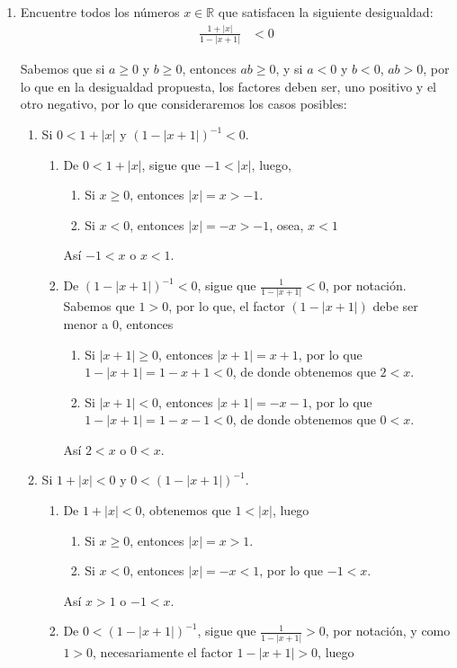 \documentclass[11pt]{article}
\newcommand{\R}{\mathbb{R}}
\begin{document}
\begin{enumerate}
\item Encuentre todos los números $x\in \R$ que satisfacen la siguiente desigualdad: \begin{align*}
 \frac{1+|x|}{1-|x+1|} &< 0
\end{align*}

Sabemos que si $a\geq 0$ y $b \geq 0$, entonces $ab\geq 0$, y si $a<0$ y $b<0$, $ab>0$, por lo que en la desigualdad propuesta, los factores deben ser, uno positivo y el otro negativo, por lo que consideraremos los casos posibles: \begin{enumerate}[label=Caso (\arabic*)]
 \item Si $0<1+|x|$ y $(1-|x+1|)^{-1}<0$. \begin{enumerate}[label=\alph*)]
  \item De $0<1+|x|$, sigue que $-1<|x|$, luego, \begin{enumerate}[label=\roman*)]
   \item Si $x\geq 0$, entonces $|x|=x>-1$.
   \item Si $x<0$, entonces $|x|=-x>-1$, osea, $x<1$
  \end{enumerate} Así $-1<x$ o $x<1$.
  \item De $(1-|x+1|)^{-1}<0$, sigue que $\frac{1}{1-|x+1|}<0$, por notación. Sabemos que $1>0$, por lo que, el factor $(1-|x+1|)$ debe ser menor a $0$, entonces \begin{enumerate}[label=\roman*)]
   \item Si $|x+1|\geq 0 $, entonces $|x+1|=x+1$, por lo que $1-|x+1|=1-x+1<0$, de donde obtenemos que $2<x$.
   \item Si $|x+1|<0$, entonces $|x+1|=-x-1$, por lo que $1-|x+1|=1-x-1<0$, de donde obtenemos que $0<x$.
  \end{enumerate} Así $2<x$ o $0<x$.
 \end{enumerate}
 \item Si $1+|x|<0$ y $0<(1-|x+1|)^{-1}$. \begin{enumerate}[label=\alph*)]
  \item De $1+|x|<0$, obtenemos que $1<|x|$, luego \begin{enumerate}[label=\roman*)]
   \item Si $x\geq 0$, entonces $|x|=x>1$.
   \item Si $x<0$, entonces $|x|=-x<1$, por lo que $-1<x$.
  \end{enumerate} Así $x>1$ o $-1<x$.
   \item De $0<(1-|x+1|)^{-1}$, sigue que $\frac{1}{1-|x+1|}>0$, por notación, y como $1>0$, necesariamente el factor $1-|x+1|>0$, luego \begin{enumerate}[label=\roman*)]

\end{enumerate}
\end{enumerate}
\end{enumerate}
\end{enumerate}
\end{document}
